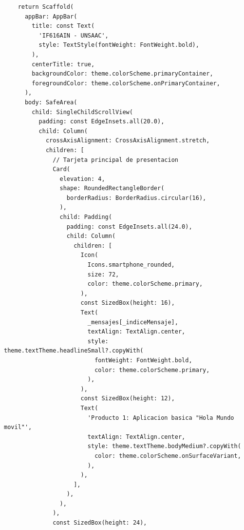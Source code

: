\documentclass[12pt,a4paper]{article}
\begin{document}
\begin{lstlisting}
    return Scaffold(
      appBar: AppBar(
        title: const Text(
          'IF616AIN - UNSAAC',
          style: TextStyle(fontWeight: FontWeight.bold),
        ),
        centerTitle: true,
        backgroundColor: theme.colorScheme.primaryContainer,
        foregroundColor: theme.colorScheme.onPrimaryContainer,
      ),
      body: SafeArea(
        child: SingleChildScrollView(
          padding: const EdgeInsets.all(20.0),
          child: Column(
            crossAxisAlignment: CrossAxisAlignment.stretch,
            children: [
              // Tarjeta principal de presentacion
              Card(
                elevation: 4,
                shape: RoundedRectangleBorder(
                  borderRadius: BorderRadius.circular(16),
                ),
                child: Padding(
                  padding: const EdgeInsets.all(24.0),
                  child: Column(
                    children: [
                      Icon(
                        Icons.smartphone_rounded,
                        size: 72,
                        color: theme.colorScheme.primary,
                      ),
                      const SizedBox(height: 16),
                      Text(
                        _mensajes[_indiceMensaje],
                        textAlign: TextAlign.center,
                        style: theme.textTheme.headlineSmall?.copyWith(
                          fontWeight: FontWeight.bold,
                          color: theme.colorScheme.primary,
                        ),
                      ),
                      const SizedBox(height: 12),
                      Text(
                        'Producto 1: Aplicacion basica "Hola Mundo movil"',
                        textAlign: TextAlign.center,
                        style: theme.textTheme.bodyMedium?.copyWith(
                          color: theme.colorScheme.onSurfaceVariant,
                        ),
                      ),
                    ],
                  ),
                ),
              ),
              const SizedBox(height: 24),


\end{lstlisting}
\end{document}
